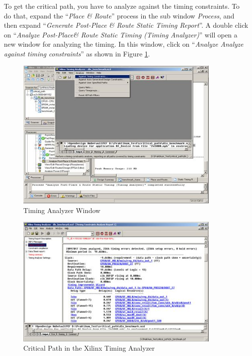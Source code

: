 To get the critical path, you have to analyze against the timing
constraints. To do that, expand the ``\emph{Place \& Route}'' process in
the sub window \emph{Process}, and then expand ``\emph{Generate
Post-Place \& Route Static Timing Report}''. A double click on
``\emph{Analyze Post-Place\& Route Static Timing (Timing Analyzer)}''
will open a new window for analyzing the timing. In this window, click
on ``\emph{Analyze Analyze against timing constraints}'' as shown in
Figure \ref{fig:fig612}.
\begin{figure}[!htb]
	\centering
	\includegraphics[width=0.9\textwidth]{src/images/6-12.png}
	\caption{Timing Analyzer Window}
	\label{fig:fig612}
\end{figure}
\begin{figure}[!htb]
	\centering
	\includegraphics[width=0.9\textwidth]{src/images/6-13.png}
	\caption{Critical Path in the Xilinx Timing Analyzer}
	\label{fig:fig613}
\end{figure}

